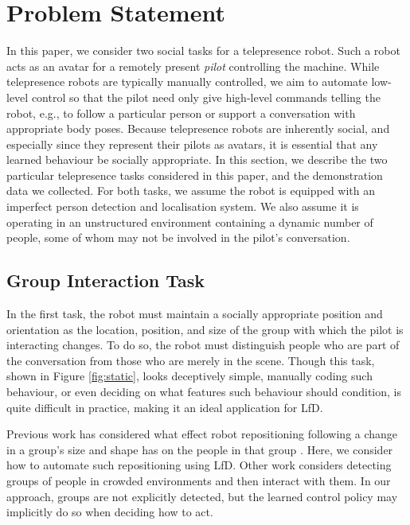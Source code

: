 \documentclass[letterpaper, 10 pt, conference]{ieeeconf}
\begin{document}
\section{Problem Statement \label{sec:related_work}}

In this paper, we consider two social tasks for a telepresence robot.  Such a robot acts as an avatar for a remotely present \emph{pilot} controlling the machine.  While telepresence robots are typically manually controlled, we aim to automate low-level control so that the pilot need only give high-level commands telling the robot, e.g., to follow a particular person or support a conversation with appropriate body poses.  Because telepresence robots are inherently social, and especially since they represent their pilots as avatars, it is essential that any learned behaviour be socially appropriate. In this section, we describe the two particular telepresence tasks considered in this paper, and the demonstration data we collected.  For both tasks, we assume the robot is equipped with an imperfect person detection and localisation system.  We also assume it is operating in an unstructured environment containing a dynamic number of people, some of whom may not be involved in the pilot's conversation.

\vspace{-1mm}
\subsection{Group Interaction Task} 

In the first task, the robot must maintain a socially appropriate position and orientation as the location, position, and size of the group with which the pilot is interacting changes.  To do so, the robot must distinguish people who are part of the conversation from those who are merely in the scene. Though this task, shown in Figure \ref{fig:static}, looks deceptively simple, manually coding such behaviour, or even deciding on what features such behaviour should condition, is quite difficult in practice, making it an ideal application for LfD.

Previous work has considered what effect robot repositioning following a change in a group's size and shape has on the people in that group \cite{kuzuoka2010reconfiguring,vroon2015dynamics}. Here, we consider how to automate such repositioning using LfD.  Other work considers detecting groups of people in crowded environments \cite{lau2010multi} and then interact with them.  In our approach, groups are not explicitly detected, but the learned control policy may implicitly do so when deciding how to act.
\end{document}
